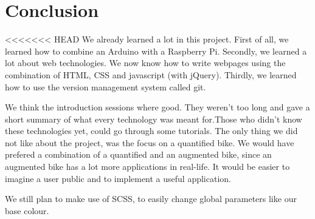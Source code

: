 \section{Conclusion}
<<<<<<< HEAD
We already learned a lot in this project. First of all, we learned how to combine an
Arduino with a Raspberry Pi. Secondly, we learned a lot about web technologies. We now
know how to write webpages using the combination of HTML, CSS and javascript (with
jQuery). Thirdly, we learned how to use the version management system called git.

We think the introduction sessions where good. They weren't too long and gave a short summary of what every technology was meant for.Those who didn't know these
technologies yet, could go through some tutorials. The only thing we did not like about the project, was the focus on 
a quantified bike. We would have prefered a combination of a quantified and an augmented bike, since an augmented bike
has a lot more applications in real-life. It would be easier to imagine a user public and to implement a useful application.

We still plan to make use of SCSS, to easily change global parameters like our base colour.

